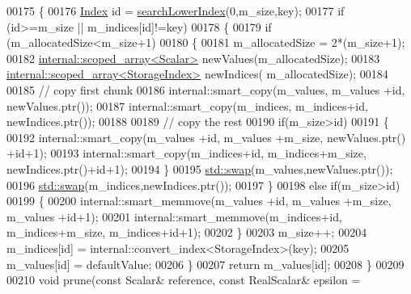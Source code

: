 \begin{DoxyCode}
00175     \{
00176       \hyperlink{namespace_eigen_a62e77e0933482dafde8fe197d9a2cfde}{Index} \textcolor{keywordtype}{id} = \hyperlink{class_eigen_1_1internal_1_1_compressed_storage_ad96105b5ab19886e96076513eab77da5}{searchLowerIndex}(0,m\_size,key);
00177       \textcolor{keywordflow}{if} (\textcolor{keywordtype}{id}>=m\_size || m\_indices[\textcolor{keywordtype}{id}]!=key)
00178       \{
00179         \textcolor{keywordflow}{if} (m\_allocatedSize<m\_size+1)
00180         \{
00181           m\_allocatedSize = 2*(m\_size+1);
00182           \hyperlink{class_eigen_1_1internal_1_1scoped__array}{internal::scoped\_array<Scalar>} newValues(m\_allocatedSize);
00183           \hyperlink{class_eigen_1_1internal_1_1scoped__array}{internal::scoped\_array<StorageIndex>} newIndices(
      m\_allocatedSize);
00184 
00185           \textcolor{comment}{// copy first chunk}
00186           internal::smart\_copy(m\_values,  m\_values +\textcolor{keywordtype}{id}, newValues.ptr());
00187           internal::smart\_copy(m\_indices, m\_indices+\textcolor{keywordtype}{id}, newIndices.ptr());
00188 
00189           \textcolor{comment}{// copy the rest}
00190           \textcolor{keywordflow}{if}(m\_size>\textcolor{keywordtype}{id})
00191           \{
00192             internal::smart\_copy(m\_values +\textcolor{keywordtype}{id},  m\_values +m\_size, newValues.ptr() +\textcolor{keywordtype}{id}+1);
00193             internal::smart\_copy(m\_indices+\textcolor{keywordtype}{id},  m\_indices+m\_size, newIndices.ptr()+\textcolor{keywordtype}{id}+1);
00194           \}
00195           \hyperlink{endian_8c_a3ca5ecd34b04d6a243c054ac3a57f68d}{std::swap}(m\_values,newValues.ptr());
00196           \hyperlink{endian_8c_a3ca5ecd34b04d6a243c054ac3a57f68d}{std::swap}(m\_indices,newIndices.ptr());
00197         \}
00198         \textcolor{keywordflow}{else} \textcolor{keywordflow}{if}(m\_size>\textcolor{keywordtype}{id})
00199         \{
00200           internal::smart\_memmove(m\_values +\textcolor{keywordtype}{id}, m\_values +m\_size, m\_values +\textcolor{keywordtype}{id}+1);
00201           internal::smart\_memmove(m\_indices+\textcolor{keywordtype}{id}, m\_indices+m\_size, m\_indices+\textcolor{keywordtype}{id}+1);
00202         \}
00203         m\_size++;
00204         m\_indices[id] = internal::convert\_index<StorageIndex>(key);
00205         m\_values[id] = defaultValue;
00206       \}
00207       \textcolor{keywordflow}{return} m\_values[id];
00208     \}
00209 
00210     \textcolor{keywordtype}{void} prune(\textcolor{keyword}{const} Scalar& reference, \textcolor{keyword}{const} RealScalar& epsilon = 

\end{DoxyCode}
